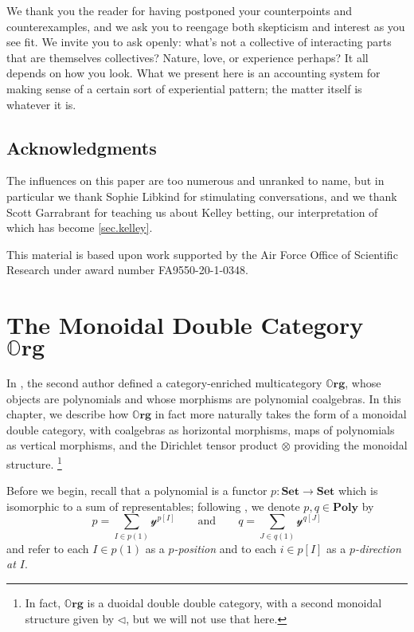 \documentclass[11pt, one side, article]{memoir}
\theoremstyle{definition}
\theoremstyle{plain}
\newcommand{\Cat}[1]{\mathbf{#1}}%
\newcommand{\smset}{\Cat{Set}}
\newcommand{\yon}{\mathcal{y}}
\newcommand{\poly}{\Cat{Poly}}
\newcommand{\0}{\textsf{0}}
\newcommand{\1}{\tn{\textsf{1}}}
\newcommand{\tri}{\mathbin{\triangleleft}}
\newcommand{\qqand}{\qquad\text{and}\qquad}
\newcommand{\org}{{\mathbb{O}\Cat{rg}}}
\begin{document}
We thank you the reader for having postponed your counterpoints and counterexamples, and we ask you to reengage both skepticism and interest as you see fit. We invite you to ask openly: what's not a collective of interacting parts that are themselves collectives? Nature, love, or experience perhaps? It all depends on how you look. What we present here is an accounting system for making sense of a certain sort of experiential pattern; the matter itself is whatever it is.

\section{Acknowledgments}

The influences on this paper are too numerous and unranked to name, but in particular we thank Sophie Libkind for stimulating conversations, and we thank Scott Garrabrant for teaching us about Kelley betting, our interpretation of which has become \cref{sec.kelley}.

This material is based upon work supported by the Air Force Office of Scientific Research under award number FA9550-20-1-0348.


\chapter{The Monoidal Double Category $\org$}\label{chap.org}

In \cite{spivak2021learners}, the second author defined a category-enriched multicategory $\org$, whose objects are polynomials and whose morphisms are polynomial coalgebras. In this chapter, we describe how $\org$ in fact more naturally takes the form of a monoidal double category, with coalgebras as horizontal morphisms, maps of polynomials as vertical morphisms, and the Dirichlet tensor product $\otimes$ providing the monoidal structure.%
\footnote{In fact, $\org$ is a duoidal double double category, with a second monoidal structure given by $\tri$, but we will not use that here.}

Before we begin, recall that a polynomial is a functor $p\colon \smset\to\smset$ which is isomorphic to a sum of representables; following \cite{spivak2021learners}, we denote $p,q\in\poly$ by
\begin{equation}\label{eqn.poly_notation}
p = \sum_{I \in p(1)} \yon^{p[I]} \qqand q = \sum_{J \in q(1)} \yon^{q[J]}
\end{equation}
and refer to each $I\in p(1)$ as a \emph{$p$-position} and to each $i\in p[I]$ as a \emph{$p$-direction at $I$}.
\end{document}
